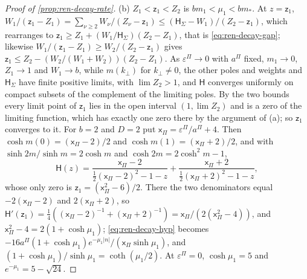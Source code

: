 \begin{proof}[Proof of \cref{prop:ren-decay-rate}]
(b) $Z_1<\mathsf z_1<Z_2$ is $bm_1<\mu_1<bm_\ast$. At $z=\mathsf z_1$, $W_1/(\mathsf z_1-Z_1)=\sum_{\nu\ge2}W_\nu/(Z_\nu-\mathsf z_1)\le(\mathsf H_\Sigma-W_1)/(Z_2-\mathsf z_1)$, which rearranges to $\mathsf z_1\ge Z_1+(W_1/\mathsf H_\Sigma)(Z_2-Z_1)$, that is \eqref{eq:ren-decay-gap}; likewise $W_1/(\mathsf z_1-Z_1)\ge W_2/(Z_2-\mathsf z_1)$ gives $\mathsf z_1\le Z_2-(W_2/(W_1+W_2))(Z_2-Z_1)$. As $\varepsilon^\Pi\to0$ with $a^\Pi$ fixed, $m_1\to0$, $Z_1\to1$ and $W_1\to b$, while $m(k_\perp)$ for $k_\perp\ne0$, the other poles and weights and $\mathsf H_\Sigma$ have finite positive limits, with $\lim Z_2>1$, and $\mathsf H$ converges uniformly on compact subsets of the complement of the limiting poles. By the two bounds every limit point of $\mathsf z_1$ lies in the open interval $(1,\lim Z_2)$ and is a zero of the limiting function, which has exactly one zero there by the argument of (a); so $\mathsf z_1$ converges to it. For $b=2$ and $D=2$ put $\mathsf x_\Pi=\varepsilon^\Pi/a^\Pi+4$. Then $\cosh m(0)=(\mathsf x_\Pi-2)/2$ and $\cosh m(1)=(\mathsf x_\Pi+2)/2$, and with $\sinh2m/\sinh m=2\cosh m$ and $\cosh2m=2\cosh^2m-1$,
\[
\mathsf H(z)=\frac{\mathsf x_\Pi-2}{\frac12(\mathsf x_\Pi-2)^2-1-z}+\frac{\mathsf x_\Pi+2}{\frac12(\mathsf x_\Pi+2)^2-1-z},
\]
whose only zero is $\mathsf z_1=(\mathsf x_\Pi^2-6)/2$. There the two denominators equal $-2(\mathsf x_\Pi-2)$ and $2(\mathsf x_\Pi+2)$, so $\mathsf H'(\mathsf z_1)=\frac14((\mathsf x_\Pi-2)^{-1}+(\mathsf x_\Pi+2)^{-1})=\mathsf x_\Pi/(2(\mathsf x_\Pi^2-4))$, and $\mathsf x_\Pi^2-4=2(1+\cosh\mu_1)$; \eqref{eq:ren-decay-hyp} becomes $-16a^\Pi(1+\cosh\mu_1)e^{-\mu_1\lvert n\rvert}/(\mathsf x_\Pi\sinh\mu_1)$, and $(1+\cosh\mu_1)/\sinh\mu_1=\coth(\mu_1/2)$. At $\varepsilon^\Pi=0$, $\cosh\mu_1=5$ and $e^{-\mu_1}=5-\sqrt{24}$.


\end{proof}
